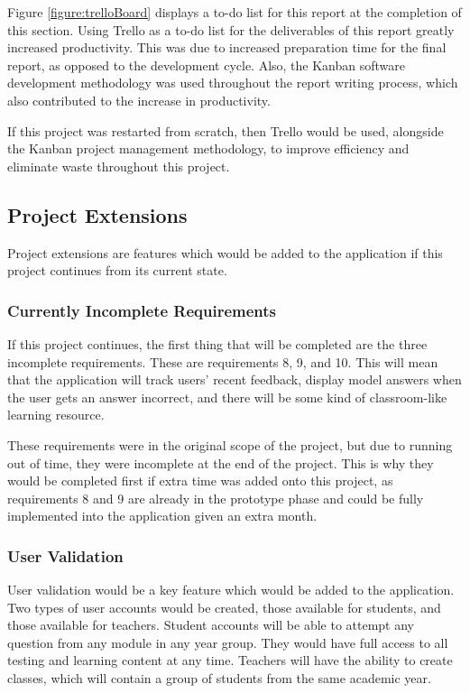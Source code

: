 \documentclass{article}
\begin{document}
Figure \ref{figure:trelloBoard} displays a to-do list for this report at the completion of this section. Using Trello as a to-do list for the deliverables of this report greatly increased productivity. This was due to increased preparation time for the final report, as opposed to the development cycle. Also, the Kanban software development methodology was used throughout the report writing process, which also contributed to the increase in productivity. \par

If this project was restarted from scratch, then Trello would be used, alongside the Kanban project management methodology, to improve efficiency and eliminate waste throughout this project. \par

\subsection{Project Extensions}

Project extensions are features which would be added to the application if this project continues from its current state. 

\subsubsection{Currently Incomplete Requirements}

If this project continues, the first thing that will be completed are the three incomplete requirements. These are requirements 8, 9, and 10. This will mean that the application will track users' recent feedback, display model answers when the user gets an answer incorrect, and there will be some kind of classroom-like learning resource. \par

These requirements were in the original scope of the project, but due to running out of time, they were incomplete at the end of the project. This is why they would be completed first if extra time was added onto this project, as requirements 8 and 9 are already in the prototype phase and could be fully implemented into the application given an extra month. 

\subsubsection{User Validation}

User validation would be a key feature which would be added to the application. Two types of user accounts would be created, those available for students, and those available for teachers. Student accounts will be able to attempt any question from any module in any year group. They would have full access to all testing and learning content at any time. Teachers will have the ability to create classes, which will contain a group of students from the same academic year. \par
\end{document}
